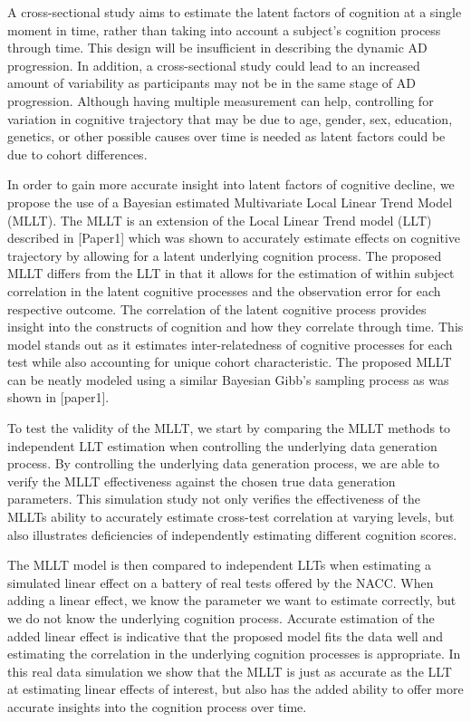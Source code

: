 \documentclass[
]{article}
\begin{document}
A cross-sectional study aims to estimate the latent factors of cognition at a single moment in time, rather than taking into account a subject's cognition process through time. This design will be insufficient in describing the dynamic AD progression. In addition, a cross-sectional study could lead to an increased amount of variability as participants may not be in the same stage of AD progression. Although having multiple measurement can help, controlling for variation in cognitive trajectory that may be due to age, gender, sex, education, genetics, or other possible causes over time is needed as latent factors could be due to cohort differences.

In order to gain more accurate insight into latent factors of cognitive decline, we propose the use of a Bayesian estimated Multivariate Local Linear Trend Model (MLLT). The MLLT is an extension of the Local Linear Trend model (LLT) described in {[}Paper1{]} which was shown to accurately estimate effects on cognitive trajectory by allowing for a latent underlying cognition process. The proposed MLLT differs from the LLT in that it allows for the estimation of within subject correlation in the latent cognitive processes and the observation error for each respective outcome. The correlation of the latent cognitive process provides insight into the constructs of cognition and how they correlate through time. This model stands out as it estimates inter-relatedness of cognitive processes for each test while also accounting for unique cohort characteristic. The proposed MLLT can be neatly modeled using a similar Bayesian Gibb's sampling process as was shown in {[}paper1{]}.

To test the validity of the MLLT, we start by comparing the MLLT methods to independent LLT estimation when controlling the underlying data generation process. By controlling the underlying data generation process, we are able to verify the MLLT effectiveness against the chosen true data generation parameters. This simulation study not only verifies the effectiveness of the MLLTs ability to accurately estimate cross-test correlation at varying levels, but also illustrates deficiencies of independently estimating different cognition scores.

The MLLT model is then compared to independent LLTs when estimating a simulated linear effect on a battery of real tests offered by the NACC. When adding a linear effect, we know the parameter we want to estimate correctly, but we do not know the underlying cognition process. Accurate estimation of the added linear effect is indicative that the proposed model fits the data well and estimating the correlation in the underlying cognition processes is appropriate. In this real data simulation we show that the MLLT is just as accurate as the LLT at estimating linear effects of interest, but also has the added ability to offer more accurate insights into the cognition process over time.
\end{document}

